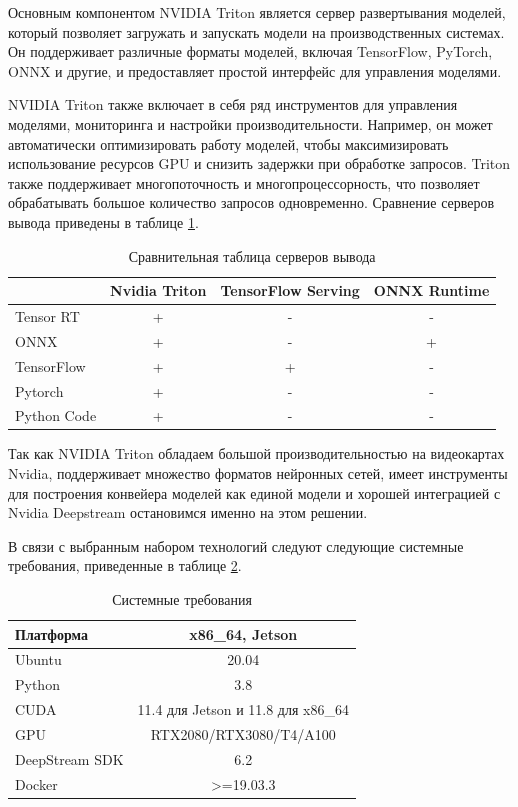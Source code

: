 Основным компонентом NVIDIA Triton является сервер развертывания моделей, который позволяет загружать и запускать модели на производственных системах. Он поддерживает различные форматы моделей, включая TensorFlow, PyTorch, ONNX и другие, и предоставляет простой интерфейс для управления моделями.

NVIDIA Triton также включает в себя ряд инструментов для управления моделями, мониторинга и настройки производительности. Например, он может автоматически оптимизировать работу моделей, чтобы максимизировать использование ресурсов GPU и снизить задержки при обработке запросов. Triton также поддерживает многопоточность и многопроцессорность, что позволяет обрабатывать большое количество запросов одновременно. Сравнение серверов вывода приведены в таблице  \ref{tab:tab2}.


\begin{table}    
    \caption{Сравнительная таблица серверов вывода}
    \begin{tabularx}{\textwidth}{|X|c|c|c|}\hline
         & Nvidia Triton & TensorFlow Serving  & ONNX Runtime\\ \hline
    Tensor RT  & +   & -    & -            \\ \hline
    ONNX       & +   & -    & +         \\ \hline
    TensorFlow   & +   & +    & -          \\ \hline
    Pytorch & +   & -    & -           \\ \hline
    Python Code & +   & -    & -   \\ \hline
    \end{tabularx}
    \label{tab:tab2}
\end{table}

Так как NVIDIA Triton обладаем большой производительностью на видеокартах Nvidia, поддерживает множество форматов нейронных сетей, имеет инструменты для построения конвейера моделей как единой модели и хорошей интеграцией с Nvidia Deepstream остановимся именно на этом решении.

В связи с выбранным набором технологий следуют следующие системные требования, приведенные в таблице \ref{tab:tab3}.

\begin{table}    
    \caption{Системные требования}
    \begin{tabularx}{\textwidth}{|X|c|}\hline
    Платформа & x86\_64, Jetson\\ \hline
    Ubuntu  & 20.04           \\ \hline
    Python       & 3.8        \\ \hline
    CUDA   & 11.4 для Jetson и 11.8 для x86\_64         \\ \hline
    GPU & RTX2080/RTX3080/T4/A100   \\ \hline
    DeepStream SDK & 6.2   \\ \hline
    Docker & >=19.03.3  \\ \hline
    \end{tabularx}
    \label{tab:tab3}
\end{table}